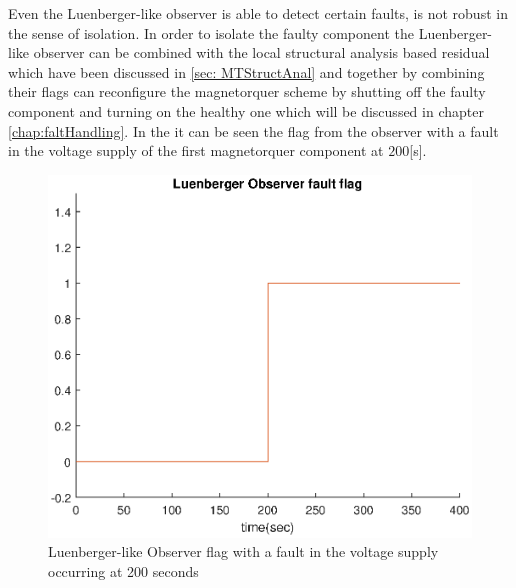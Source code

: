 %
 Even the Luenberger-like observer is able to detect certain faults, is not robust in the sense of isolation. In order to isolate the faulty component the  Luenberger-like observer can be combined with the local structural analysis based residual which have been discussed in \ref{sec: MTStructAnal} and together by combining their flags can reconfigure the magnetorquer scheme by shutting off the faulty component and turning on the healthy one which will be discussed in chapter \ref{chap:faltHandling}. In the  it can be seen the flag from the observer with a fault in the voltage supply of the first magnetorquer component at $200$[s]. 
 \begin{figure}[H]
 	\centering
 	\includegraphics[width=0.7\linewidth]{figures/Luenberger_Observerflag}
 	\caption{Luenberger-like Observer flag with a fault in the voltage supply occurring at 200 seconds   }
 	\label{fig:obsflag}
 \end{figure}

%